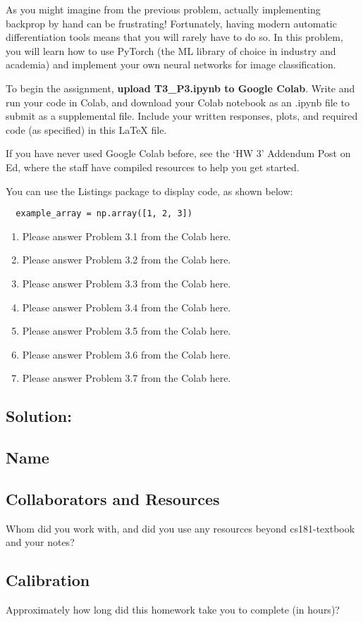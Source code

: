 \documentclass[submit]{harvardml}
\begin{document}
\begin{problem}

  As you might imagine from the previous problem, actually implementing
  backprop by hand can be frustrating!  Fortunately, having modern
  automatic differentiation tools means that you will rarely have to do
  so.  In this problem, you will learn how to use PyTorch (the ML library of choice in industry and academia) and implement your own neural networks for image classification.
  
  To begin the assignment, \textbf{upload T3\_P3.ipynb to Google Colab}.  Write and run your code in Colab, and download your Colab notebook as an .ipynb file to submit as a supplemental file. Include your written responses, plots, and required code (as specified) in this LaTeX file.  
  
  If you have never used Google Colab before, see the `HW 3' Addendum Post on Ed, where the staff have compiled resources to help you get started. 
  
  You can use the Listings package to display code, as shown below:
  
  \begin{lstlisting}
  example_array = np.array([1, 2, 3])
  \end{lstlisting}
  
  \begin{enumerate}
      \item Please answer Problem 3.1 from the Colab here.
      \item Please answer Problem 3.2 from the Colab here.
      \item Please answer Problem 3.3 from the Colab here.
      \item Please answer Problem 3.4 from the Colab here.
      \item Please answer Problem 3.5 from the Colab here.
      \item Please answer Problem 3.6 from the Colab here.
      \item Please answer Problem 3.7 from the Colab here.
  \end{enumerate}
  
\end{problem}


\subsection*{Solution:}

\newpage
\subsection*{Name}

\subsection*{Collaborators and Resources}
Whom did you work with, and did you use any resources beyond cs181-textbook and your notes?

\subsection*{Calibration}
Approximately how long did this homework take you to complete (in hours)? 
\end{document}
